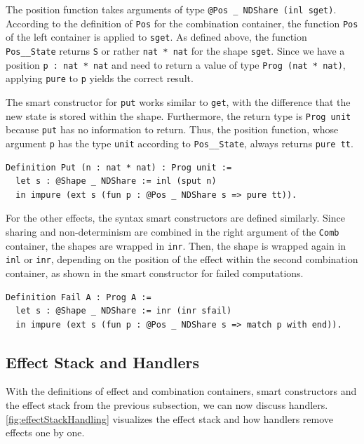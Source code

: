 \documentclass[a4paper, 11pt, fleqn, twoside]{scrreprt}
\newcommand{\hinl}[1]{\texttt{#1}}
\newcommand{\cinl}[1]{\texttt{#1}}
\begin{document}
The position function takes arguments of type \cinl{@Pos _ NDShare (inl sget)}.
According to the definition of \cinl{Pos} for the combination container, the function \cinl{Pos} of the left container is applied to \cinl{sget}.
As defined above, the function \cinl{Pos__State} returns \cinl{S} or rather \cinl{nat * nat} for the shape \cinl{sget}.
Since we have a position \cinl{p : nat * nat} and need to return a value of type \cinl{Prog (nat * nat)}, applying \cinl{pure} to \cinl{p} yields the correct result.

The smart constructor for \hinl{put} works similar to \hinl{get}, with the difference that the new state is stored within the shape.
Furthermore, the return type is \cinl{Prog unit} because \hinl{put} has no information to return.
Thus, the position function, whose argument \cinl{p} has the type \cinl{unit} according to \cinl{Pos__State}, always returns \cinl{pure tt}.

\begin{verbatim}
Definition Put (n : nat * nat) : Prog unit :=
  let s : @Shape _ NDShare := inl (sput n)
  in impure (ext s (fun p : @Pos _ NDShare s => pure tt)).
\end{verbatim}

For the other effects, the syntax smart constructors are defined similarly.
Since sharing and non-determinism are combined in the right argument of the \cinl{Comb} container, the shapes are wrapped in \cinl{inr}.
Then, the shape is wrapped again in \cinl{inl} or \cinl{inr}, depending on the position of the effect within the second combination container, as shown in the smart constructor for failed computations.

\begin{verbatim}
Definition Fail A : Prog A :=
  let s : @Shape _ NDShare := inr (inr sfail)
  in impure (ext s (fun p : @Pos _ NDShare s => match p with end)).
\end{verbatim}

\subsection{Effect Stack and Handlers}
\label{subsec:effectstack}

With the definitions of effect and combination containers, smart constructors and the effect stack from the previous subsection, we can now discuss handlers.
\autoref{fig:effectStackHandling} visualizes the effect stack and how handlers remove effects one by one.
\end{document}
